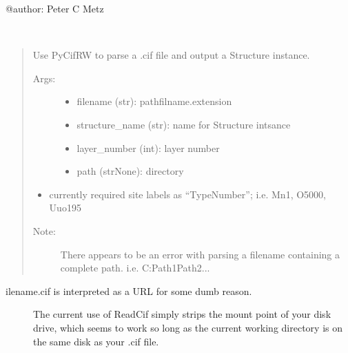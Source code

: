 \documentclass[letterpaper,10pt,english]{sphinxmanual}
\begin{document}
@author: Peter C Metz

\begin{fulllineitems}
\label{\detokenize{rst/structure:mstack.structure.build_cif}}~\begin{quote}

Use PyCifRW to parse a .cif file and output a Structure instance.
\begin{description}
\item[{Args:}] \leavevmode\begin{itemize}
\item {} 
filename (str): pathfilname.extension

\item {} 
structure\_name (str): name for Structure intsance

\item {} 
layer\_number (int): layer number

\item {} 
path (str\textbar{}None): directory

\end{itemize}

\end{description}
\begin{itemize}
\item {} 
currently required site labels as ``TypeNumber''; i.e. Mn1, O5000, Uuo195

\end{itemize}
\begin{description}
\item[{Note:}] \leavevmode
There appears to be an error with parsing a filename containing a complete path.
i.e. C:Path1Path2...

\end{description}
\end{quote}
\begin{description}
\item[{ilename.cif is interpreted as a URL for some dumb reason.}] \leavevmode
The current use of ReadCif simply strips the mount point of your disk drive, which
seems to work so long as the current working directory is on the same disk as your
.cif file.

\end{description}

\end{fulllineitems}
\end{document}
